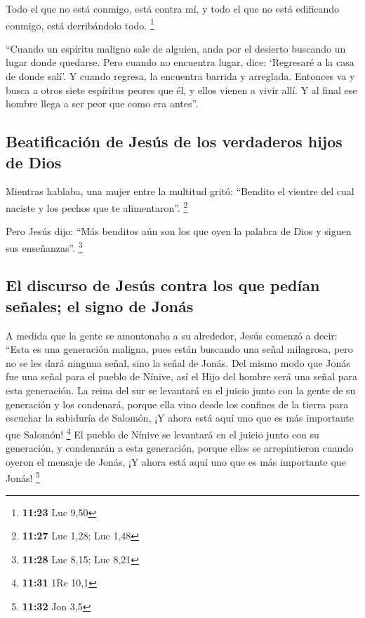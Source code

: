  Todo el que no está conmigo, está contra mí, y todo el
que no está edificando conmigo, está derribándolo todo. \footnote{\textbf{11:23}
  Luc 9,50}

 ``Cuando un espíritu maligno sale de alguien, anda por
el desierto buscando un lugar donde quedarse. Pero cuando no encuentra
lugar, dice: `Regresaré a la casa de donde salí'.  Y
cuando regresa, la encuentra barrida y arreglada. 
Entonces va y busca a otros siete espíritus peores que él, y ellos
vienen a vivir allí. Y al final ese hombre llega a ser peor que como era
antes''.

\hypertarget{beatificaciuxf3n-de-jesuxfas-de-los-verdaderos-hijos-de-dios}{%
\subsection{Beatificación de Jesús de los verdaderos hijos de
Dios}\label{beatificaciuxf3n-de-jesuxfas-de-los-verdaderos-hijos-de-dios}}

 Mientras hablaba, una mujer entre la multitud gritó:
``Bendito el vientre del cual naciste y los pechos que te alimentaron''.
\footnote{\textbf{11:27} Luc 1,28; Luc 1,48}

 Pero Jesús dijo: ``Más benditos aún son los que oyen la
palabra de Dios y siguen sus enseñanzas''. \footnote{\textbf{11:28} Luc
  8,15; Luc 8,21}

\hypertarget{el-discurso-de-jesuxfas-contra-los-que-peduxedan-seuxf1ales-el-signo-de-jonuxe1s}{%
\subsection{El discurso de Jesús contra los que pedían señales; el signo
de
Jonás}\label{el-discurso-de-jesuxfas-contra-los-que-peduxedan-seuxf1ales-el-signo-de-jonuxe1s}}

 A medida que la gente se amontonaba a su alrededor,
Jesús comenzó a decir: ``Esta es una generación maligna, pues están
buscando una señal milagrosa, pero no se les dará ninguna señal, sino la
señal de Jonás.  Del mismo modo que Jonás fue una señal
para el pueblo de Nínive, así el Hijo del hombre será una señal para
esta generación.  La reina del sur se levantará en el
juicio junto con la gente de su generación y los condenará, porque ella
vino desde los confines de la tierra para escuchar la sabiduría de
Salomón, ¡Y ahora está aquí uno que es más importante que Salomón!
\footnote{\textbf{11:31} 1Re 10,1}  El pueblo de Nínive
se levantará en el juicio junto con su generación, y condenarán a esta
generación, porque ellos se arrepintieron cuando oyeron el mensaje de
Jonás, ¡Y ahora está aquí uno que es más importante que Jonás!
\footnote{\textbf{11:32} Jon 3,5}

